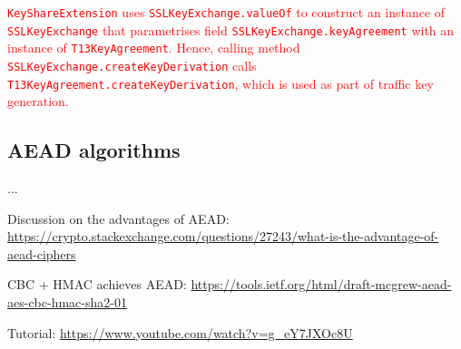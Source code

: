\documentclass[envcountsame]{article}
\newcommand{\code}{\lstinline[style=inlinestyle,breakatwhitespace=true]}
\begin{document}
\textcolor{red}{\code{KeyShareExtension} uses \code{SSLKeyExchange.valueOf} to 
  construct an instance of \code{SSLKeyExchange} that parametrises field 
  \code{SSLKeyExchange.keyAgreement} with an instance of \code{T13KeyAgreement}.
  Hence, calling method \code{SSLKeyExchange.createKeyDerivation} calls
  \code{T13KeyAgreement.createKeyDerivation}, which is used as part of 
  traffic key generation.}

\subsection{AEAD algorithms}\label{sec:aead}

...


Discussion on the advantages of AEAD: \url{https://crypto.stackexchange.com/questions/27243/what-is-the-advantage-of-aead-ciphers}

CBC + HMAC achieves AEAD: \url{https://tools.ietf.org/html/draft-mcgrew-aead-aes-cbc-hmac-sha2-01}

Tutorial: \url{https://www.youtube.com/watch?v=g_eY7JXOc8U}

\fi


%

\appendix
%






%
%
\end{document}
